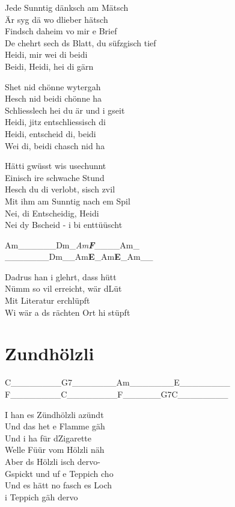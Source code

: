 \documentclass[
  letterpaper,
]{scrbook}
\begin{document}
Jede Sunntig dänksch am Mätsch\\
Är syg dä wo d\textquotesingle lieber hätsch\\
Findsch daheim vo mir e Brief\\
De chehrt sech ds Blatt, du süfzgisch tief\\
Heidi, mir wei di beidi\\
Beidi, Heidi, hei di gärn

S\textquotesingle het nid chönne wytergah\\
Hesch nid beidi chönne ha\\
Schliesslech hei du är und i gseit\\
Heidi, jitz entschliessisch di\\
Heidi, entscheid di, beidi\\
Wei di, beidi chasch nid ha

Hätti gwüsst wis usechunnt\\
Einisch ire schwache Stund\\
Hesch du di verlobt, s\textquotesingle isch zvil\\
Mit ihm am Sunntig nach em Spil\\
Nei, di Entscheidig, Heidi\\
Nei dy Bscheid - i bi enttüüscht

\textbar Am\_\_\_\_\_\_\textbar Dm\_\emph{Am\textbf{\textbar{}F}}\textbar\_\_\_\_Am\_\emph{\textbar{}\\
\textbar{}}\_\_\_\_\_\_\_\textbar Dm\_\_Am\textbf{\textbar E}\_Am\textbf{\textbar E}\_Am\_\_\textbar{}

Dadrus han i glehrt, dass hütt\\
Nümm so vil erreicht, wär d\textquotesingle Lüt\\
Mit Literatur erchlüpft\\
Wi wär a ds rächten Ort hi stüpft

\hypertarget{zundhuxf6lzli}{%
\chapter{Zundhölzli}\label{zundhuxf6lzli}}

\textbar C\_\_\_\_\_\_\_\_\textbar G7\_\_\_\_\_\_\_\textbar Am\_\_\_\_\_\_\_\textbar E\_\_\_\_\_\_\_\_\textbar{}\\
\textbar F\_\_\_\_\_\_\_\_\textbar C\_\_\_\_\_\_\_\_\textbar F\_\_\_\_\_\_G7\textbar C\_\_\_\_\_\_\_\_\textbar{}

I han es Zündhölzli azündt\\
Und das het e Flamme gäh\\
Und i ha für d\textquotesingle Zigarette\\
Welle Füür vom Hölzli näh\\
Aber ds Hölzli isch dervo-\\
Gspickt und uf e Teppich cho\\
Und es hätt no fasch es Loch\\
i Teppich gäh dervo
\end{document}
